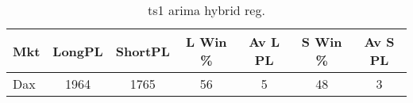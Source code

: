 \begin{table}[ht]
\centering
\caption[ts1 arima hybrid reg.]{ts1 arima hybrid reg.} 
\label{tab:chp_ts:arima_hybrid_reg}
\begin{tabular}{lcccccc}
  \toprule Mkt & LongPL & ShortPL & L Win \% & Av L PL & S Win \% & Av S PL \\ 
  \midrule Dax & 1964 & 1765 & 56 & 5 & 48 & 3 \\ 
   \bottomrule \end{tabular}
\end{table}
